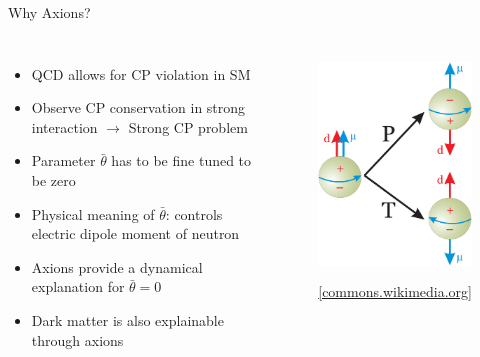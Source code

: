 \documentclass[aspectratio=1610, 9pt]{beamer}
\begin{document}
\begin{frame}{Why Axions?}
  \begin{columns}
    \begin{itemize}
      \item QCD allows for CP violation in SM
      \item Observe CP conservation in strong interaction $\rightarrow$ Strong CP problem
      \item Parameter $\bar{\theta}$ has to be fine tuned to be zero
      \item Physical meaning of $\bar{\theta}$: controls electric dipole moment of neutron
      \item Axions provide a dynamical explanation for $\bar{\theta}=0$
      \item Dark matter is also explainable through axions
    \end{itemize}
      \begin{figure}
      \includegraphics[height=6cm]{images/nEDM.png}
      \caption{\footnotesize \href{https://commons.wikimedia.org/wiki/File:NEDM_P26T_violation.png}{{[commons.wikimedia.org]}}}
      \end{figure}
  \end{columns} 
\end{frame}
\end{document}
